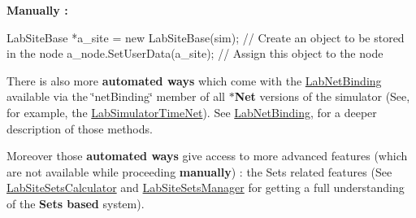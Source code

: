 {\bfseries Manually \+:}


\begin{DoxyCode}
LabSiteBase *a\_site = \textcolor{keyword}{new} LabSiteBase(sim);         \textcolor{comment}{// Create an object to be stored in the node}
a\_node.SetUserData(a\_site);                         \textcolor{comment}{// Assign this object to the node}
\end{DoxyCode}


There is also more {\bfseries automated ways} which come with the \hyperlink{classelps_1_1_lab_net_binding}{Lab\+Net\+Binding} available via the \char`\"{}net\+Binding\char`\"{} member of all {\bfseries $\ast$\+Net} versions of the simulator (See, for example, the \hyperlink{classelps_1_1_lab_simulator_time_net}{Lab\+Simulator\+Time\+Net}). See \hyperlink{classelps_1_1_lab_net_binding}{Lab\+Net\+Binding}, for a deeper description of those methods.

Moreover those {\bfseries automated ways} give access to more advanced features (which are not available while proceeding {\bfseries manually}) \+: the Sets related features (See \hyperlink{classelps_1_1_lab_site_sets_calculator}{Lab\+Site\+Sets\+Calculator} and \hyperlink{classelps_1_1_lab_site_sets_manager}{Lab\+Site\+Sets\+Manager} for getting a full understanding of the {\bfseries Sets based} system). 

